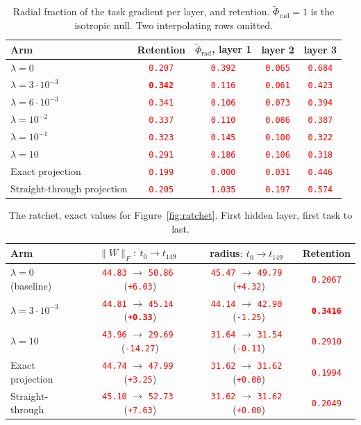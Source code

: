 \documentclass[anon]{opt2026}     %
\newcommand{\PH}[1]{\textcolor{red}{\texttt{#1}}}   %
\newcommand{\phirad}{\tilde{\Phi}_{\mathrm{rad}}}
\begin{document}
\begin{table}[!tb]
\centering
\caption{Radial fraction of the task gradient per layer, and retention.
$\phirad = 1$ is the isotropic null. Two interpolating rows omitted.}
\label{tab:phirad}
\small
\begin{tabular}{lcccc}
\toprule
Arm & Retention & $\phirad$, layer 1 & layer 2 & layer 3 \\
\midrule
$\lambda = 0$                 & \PH{0.207} & \PH{0.392} & \PH{0.065} & \PH{0.684} \\
$\lambda = 3\cdot 10^{-3}$    & \textbf{\PH{0.342}} & \PH{0.116} & \PH{0.061} & \PH{0.423} \\
$\lambda = 6\cdot 10^{-3}$    & \PH{0.341} & \PH{0.106} & \PH{0.073} & \PH{0.394} \\
$\lambda = 10^{-2}$           & \PH{0.337} & \PH{0.110} & \PH{0.086} & \PH{0.387} \\
$\lambda = 10^{-1}$           & \PH{0.323} & \PH{0.145} & \PH{0.100} & \PH{0.322} \\
$\lambda = 10$                & \PH{0.291} & \PH{0.186} & \PH{0.106} & \PH{0.318} \\
\midrule
Exact projection              & \PH{0.199} & \PH{0.000} & \PH{0.031} & \PH{0.446} \\
Straight-through projection   & \PH{0.205} & \PH{1.035} & \PH{0.197} & \PH{0.574} \\
\bottomrule
\end{tabular}
\end{table}

\begin{table}[!tb]
\centering
\caption{The ratchet, exact values for Figure~\ref{fig:ratchet}. First hidden
layer, first task to last.}
\label{tab:ratchet}
\small
\begin{tabular}{lccc}
\toprule
Arm & $\|W\|_F:\ t_0 \to t_{149}$ & radius$:\ t_0 \to t_{149}$ & Retention \\
\midrule
$\lambda = 0$ (baseline)   & \PH{44.83} $\to$ \PH{50.86} \ (\PH{+6.03}) & \PH{45.47} $\to$ \PH{49.79} \ (\PH{+4.32}) & \PH{0.2067} \\
$\lambda = 3\cdot10^{-3}$  & \PH{44.81} $\to$ \PH{45.14} \ (\textbf{\PH{+0.33}}) & \PH{44.14} $\to$ \PH{42.90} \ (\PH{-1.25}) & \textbf{\PH{0.3416}} \\
$\lambda = 10$             & \PH{43.96} $\to$ \PH{29.69} \ (\PH{-14.27}) & \PH{31.64} $\to$ \PH{31.54} \ (\PH{-0.11}) & \PH{0.2910} \\
Exact projection           & \PH{44.74} $\to$ \PH{47.99} \ (\PH{+3.25}) & \PH{31.62} $\to$ \PH{31.62} \ (\PH{+0.00}) & \PH{0.1994} \\
Straight-through           & \PH{45.10} $\to$ \PH{52.73} \ (\PH{+7.63}) & \PH{31.62} $\to$ \PH{31.62} \ (\PH{+0.00}) & \PH{0.2049} \\
\bottomrule
\end{tabular}
\end{table}
\end{document}
